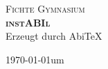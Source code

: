 \begin{titlepage}

\begin{center}



\textsc{\LARGE Fichte Gymnasium}\\[1.5cm]




\textsc{ \huge \bfseries instABIl}
\vspace {1cm}
\\Erzeugt durch Abi\TeX



\vfill

{\large \today\/um \currenttime}

\end{center}

\end{titlepage}
\recalctypearea
